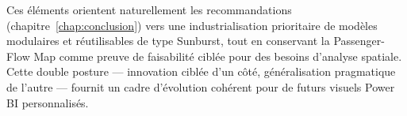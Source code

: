 Ces éléments orientent naturellement les recommandations (chapitre~\ref{chap:conclusion}) vers une industrialisation prioritaire de modèles modulaires et réutilisables de type Sunburst, tout en conservant la Passenger-Flow Map comme preuve de faisabilité ciblée pour des besoins d’analyse spatiale. Cette double posture — innovation ciblée d’un côté, généralisation pragmatique de l’autre — fournit un cadre d’évolution cohérent pour de futurs visuels Power BI personnalisés.
